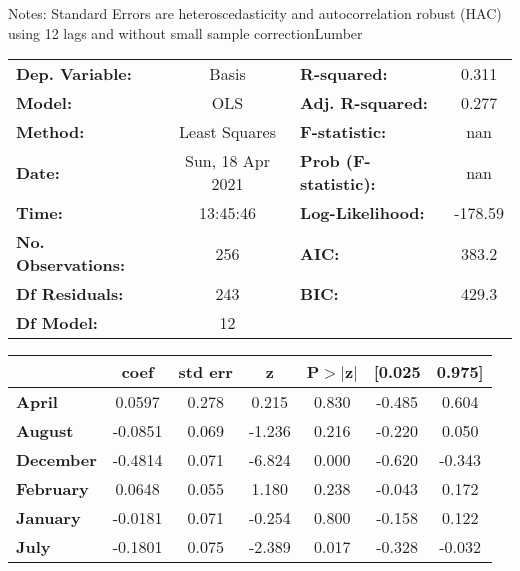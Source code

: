 Notes: \newline
 [1] Standard Errors are heteroscedasticity and autocorrelation robust (HAC) using 12 lags and without small sample correctionLumber\begin{center}
\begin{tabular}{lclc}
\toprule
\textbf{Dep. Variable:}    &      Basis       & \textbf{  R-squared:         } &     0.311   \\
\textbf{Model:}            &       OLS        & \textbf{  Adj. R-squared:    } &     0.277   \\
\textbf{Method:}           &  Least Squares   & \textbf{  F-statistic:       } &       nan   \\
\textbf{Date:}             & Sun, 18 Apr 2021 & \textbf{  Prob (F-statistic):} &      nan    \\
\textbf{Time:}             &     13:45:46     & \textbf{  Log-Likelihood:    } &   -178.59   \\
\textbf{No. Observations:} &         256      & \textbf{  AIC:               } &     383.2   \\
\textbf{Df Residuals:}     &         243      & \textbf{  BIC:               } &     429.3   \\
\textbf{Df Model:}         &          12      & \textbf{                     } &             \\
\bottomrule
\end{tabular}
\begin{tabular}{lcccccc}
                   & \textbf{coef} & \textbf{std err} & \textbf{z} & \textbf{P$> |$z$|$} & \textbf{[0.025} & \textbf{0.975]}  \\
\midrule
\textbf{April}     &       0.0597  &        0.278     &     0.215  &         0.830        &       -0.485    &        0.604     \\
\textbf{August}    &      -0.0851  &        0.069     &    -1.236  &         0.216        &       -0.220    &        0.050     \\
\textbf{December}  &      -0.4814  &        0.071     &    -6.824  &         0.000        &       -0.620    &       -0.343     \\
\textbf{February}  &       0.0648  &        0.055     &     1.180  &         0.238        &       -0.043    &        0.172     \\
\textbf{January}   &      -0.0181  &        0.071     &    -0.254  &         0.800        &       -0.158    &        0.122     \\
\textbf{July}      &      -0.1801  &        0.075     &    -2.389  &         0.017        &       -0.328    &       -0.032     \\

\end{tabular}
\end{center}
